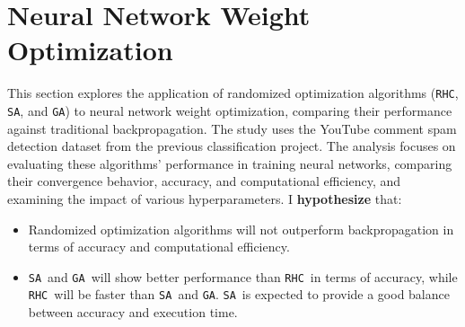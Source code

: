 \documentclass[conference]{IEEEtran}
\newcommand{\sa}{\texttt{SA}}
\newcommand{\ga}{\texttt{GA}}
\newcommand{\rhc}{\texttt{RHC}}
\begin{document}
\section{Neural Network Weight Optimization \label{sec:neural-network}}  
This section explores the application of randomized optimization algorithms (\rhc, \sa, and \ga) to neural network weight optimization, comparing their performance against traditional backpropagation. The study uses the YouTube comment spam detection dataset from the previous classification project. The analysis focuses on evaluating these algorithms' performance in training neural networks, comparing their convergence behavior, accuracy, and computational efficiency, and examining the impact of various hyperparameters.
I \textbf{hypothesize} that:
\begin{itemize}
    \item Randomized optimization algorithms will not outperform backpropagation in terms of accuracy and computational efficiency.
    \item \sa\ and \ga\ will show better performance than \rhc\ in terms of accuracy, while \rhc\ will be faster than \sa\ and \ga. \sa\ is expected to provide a good balance between accuracy and execution time.
\end{itemize}
\end{document}
